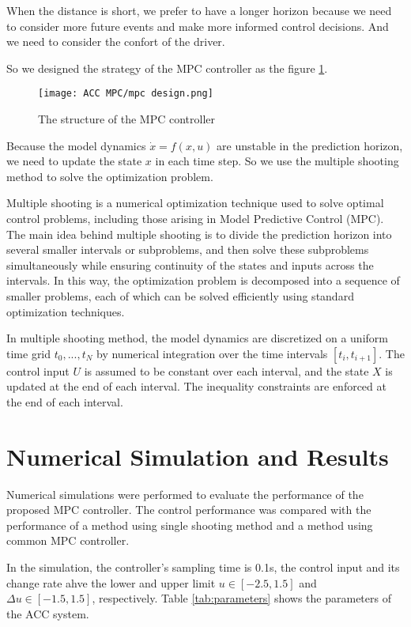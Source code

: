 \documentclass{article}
\numberwithin{equation}{section}
\begin{document}
When the distance is short, we prefer to have a longer horizon because we need
to consider more future events and make more informed control decisions. And we
need to consider the confort of the driver.

So we designed the strategy of the MPC controller as the figure
\ref{fig:mpc_design}.
\begin{figure}[h!]
    \centering
    \texttt{[image: ACC MPC/mpc design.png]}
    \caption{The structure of the MPC controller}
    \label{fig:mpc_design}
\end{figure}

Because the model dynamics $\dot{x}=f(x,u)$ are unstable in the prediction
horizon, we need to update the state $x$ in each time step. So we use the
multiple shooting method to solve the optimization problem.

Multiple shooting is a numerical optimization technique used to solve optimal
control problems, including those arising in Model Predictive Control (MPC).
The main idea behind multiple shooting is to divide the prediction horizon into
several smaller intervals or subproblems, and then solve these subproblems
simultaneously while ensuring continuity of the states and inputs across the
intervals. In this way, the optimization problem is decomposed into a sequence
of smaller problems, each of which can be solved efficiently using standard
optimization techniques.

In multiple shooting method, the model dynamics are discretized on a uniform
time grid $t_0, ..., t_N$ by numerical integration over the time intervals
$[t_i, t_{i+1}]$. The control input $U$ is assumed to be constant over each
interval, and the state $X$ is updated at the end of each interval. The
inequality constraints are enforced at the end of each interval.

\section{Numerical Simulation and Results}
Numerical simulations were performed to evaluate the performance of the
proposed MPC controller. The control performance was compared with the
performance of a method using single shooting method and a method using common
MPC controller.

In the simulation, the controller's sampling time is 0.1s, the control input
and its change rate ahve the lower and upper limit $u \in [-2.5,1.5]$ and
$\Delta u \in [-1.5,1.5]$, respectively. Table \ref{tab:parameters} shows the
parameters of the ACC system.
\end{document}
